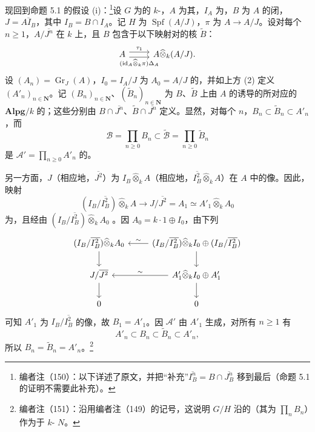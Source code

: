 现回到命题 5.1 的假设 (i)：\footnote{编者注（150）：以下详述了原文，并把“补充”$\overline{I_B^n}=B\cap\overline{J_B^n}$ 移到最后（命题 5.1 的证明不需要此补充）。}设 $G$ 为的 $k$-，$A$ 为其，$I_A$ 为，$B$ 为 $A$ 的闭，$J=\overline{AI_B}$，其中 $I_B=B\cap I_A$。记 $H$ 为 $\operatorname{Spf}(A/J)$，$\pi$ 为 $A\to A/J$。设对每个 $n\geq1$，$A/\overline{J^n}$ 在 $k$ 上，且 $B$ 包含于以下映射对的核 $\widetilde B$：
\[
\begin{tikzcd}A\arrow[r,shift left=.7ex,"\tau_1"]\arrow[r,shift right=.7ex,"(\mathrm{id}_A\widehat\otimes_k\pi)\Delta_A"']&A\widehat\otimes_k(A/J).\end{tikzcd}
\]
设 $(A_n)=\operatorname{Gr}_J(A)$，$I_0=I_A/J$ 为 $A_0=A/J$ 的，并如上方 (2) 定义 $(A'_n)_{n\in\mathbf N}$。记 $(B_n)_{n\in\mathbf N}$、$(\widetilde B_n)_{n\in\mathbf N}$ 为 $B$、$\widetilde B$ 上由 $A$ 的诱导的所对应的 $\mathbf{Alpg}/k$ 的；这些分别由 $B\cap\overline{J^n}$、$\widetilde B\cap\overline{J^n}$ 定义。显然，对每个 $n$，$B_n\subset\widetilde B_n\subset A'_n$，而
\[\mathscr B=\prod_{n\geq0}B_n\subset\widetilde{\mathscr B}=\prod_{n\geq0}\widetilde B_n\]
是 $\mathscr A'=\prod_{n\geq0}A'_n$ 的。

另一方面，$J$（相应地，$\overline{J^2}$）为 $I_B\widehat\otimes_kA$（相应地，$\overline{I_B^2}\widehat\otimes_k A$）在 $A$ 中的像。因此，映射
\[(I_B/\overline{I_B^2})\widehat\otimes_k A\longrightarrow J/\overline{J^2}=A_1\simeq A'_1\widehat\otimes_kA_0\]
为，且经由 $(I_B/\overline{I_B^2})\widehat\otimes_kA_0$ 。因 $A_0=k\cdot1\oplus I_0$，由下列
\[
\begin{tikzcd}
(I_B/\overline{I_B^2})\widehat\otimes_kA_0\arrow[d]&(I_B/\overline{I_B^2})\widehat\otimes_kI_0\oplus(I_B/\overline{I_B^2})\arrow[l,"\sim"']\arrow[d]\\
J/\overline{J^2}\arrow[d]&A'_1\widehat\otimes_kI_0\oplus A'_1\arrow[l,"\sim"']\arrow[d]\\
0&0
\end{tikzcd}
\]
可知 $A'_1$ 为 $I_B/\overline{I_B^2}$ 的像，故 $B_1=A'_1$。因 $\mathscr A'$ 由 $A'_1$ 生成，对所有 $n\geq1$ 有
\[A'_n\subset B_n\subset\widetilde B_n\subset A'_n,\]
所以 $B_n=\widetilde B_n=A'_n$。\footnote{编者注（151）：沿用编者注（149）的记号，这说明 $G/H$ 沿的（其为 $\prod_nB_n$）作为于 $k$- $N$。}

